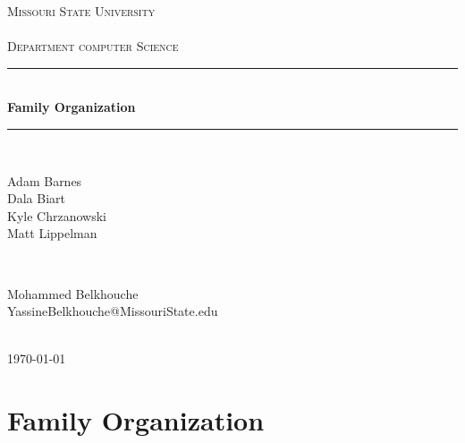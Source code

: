 \documentclass[12pt]{article}
\begin{document}
\begin{titlepage}

\newcommand{\HRule}{\rule{\linewidth}{0.5mm}} 

\center 

\textsc{\LARGE Missouri State University\\~\\Department computer Science}\\[1.0cm] 

\HRule \\[0.4cm]
{ \huge \bfseries Family Organization}\\[0.4cm] 
\HRule \\[1.5cm]



\begin{minipage}{0.4\textwidth}
\begin{flushleft} \large
Adam Barnes \\ Dala Biart \\ Kyle Chrzanowski \\ Matt Lippelman \\ 
\end{flushleft}
\end{minipage}
~
\begin{minipage}{0.4\textwidth}
\begin{flushright} \large
Mohammed Belkhouche \\ 
YassineBelkhouche@MissouriState.edu
\end{flushright}
\end{minipage}\\[2cm]

{\large \today}\\[2cm] 

\end{titlepage}

\newpage
\tableofcontents

\newpage

\section {Family Organization}
\end{document}
